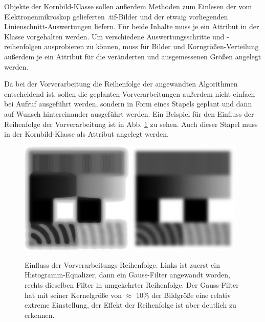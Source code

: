 \documentclass[
  12pt,
  openany]{book}
\begin{document}
Objekte der Kornbild-Klasse sollen außerdem Methoden zum Einlesen der vom Elektronenmikroskop gelieferten .tif-Bilder und der etwaig vorliegenden Linienschnitt-Auswertungen liefern. Für beide Inhalte muss je ein Attribut in der Klasse vorgehalten werden. Um verschiedene Auswertungsschritte und -reihenfolgen ausprobieren zu können, muss für Bilder und Korngrößen-Verteilung außerdem je ein Attribut für die veränderten und ausgemessenen Größen angelegt werden.

Da bei der Vorverarbeitung die Reihenfolge der angewandten Algorithmen entscheidend ist, sollen die geplanten Vorverarbeitungen außerdem nicht einfach bei Aufruf ausgeführt werden, sondern in Form eines Stapels geplant und dann auf Wunsch hintereinander ausgeführt werden. Ein Beispiel für den Einfluss der Reihenfolge der Vorverarbeitung ist in Abb. \ref{fig:prepOrder} zu sehen. Auch dieser Stapel muss in der Kornbild-Klasse als Attribut angelegt werden.





\begin{figure}

{\centering \includegraphics[width=0.48\textwidth]{../imgs/gauss_hist} \includegraphics[width=0.48\textwidth]{../imgs/hist_gauss} 

}

\caption[Einfluss der Vorverarbeitungs-Reihenfolge.]{Einfluss der Vorverarbeitungs-Reihenfolge. Links ist zuerst ein Histogramm-Equalizer, dann ein Gauss-Filter angewandt worden, rechts dieselben Filter in umgekehrter Reihenfolge. Der Gauss-Filter hat mit seiner Kernelgröße von \(\approx\) 10\% der Bildgröße eine relativ extreme Einstellung, der Effekt der Reihenfolge ist aber deutlich zu erkennen.}\label{fig:prepOrder}
\end{figure}
\end{document}
